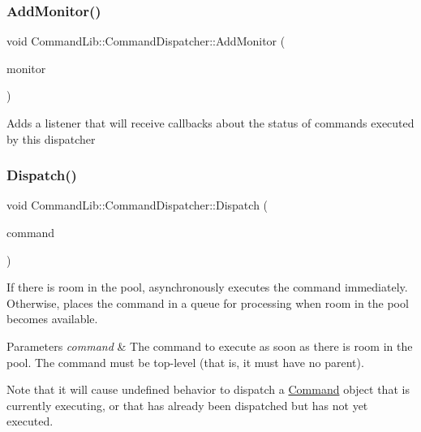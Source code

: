 \subsubsection{\texorpdfstring{Add\+Monitor()}{AddMonitor()}}
{\footnotesize\ttfamily void Command\+Lib\+::\+Command\+Dispatcher\+::\+Add\+Monitor (\begin{DoxyParamCaption}\item[{\mbox{\hyperlink{class_command_lib_1_1_command_monitor}{Command\+Monitor}} $\ast$}]{monitor }\end{DoxyParamCaption})}



Adds a listener that will receive callbacks about the status of commands executed by this dispatcher

\mbox{\label{class_command_lib_1_1_command_dispatcher_a2a1db45e830c48a4085bb2b86e47c692}} 
\subsubsection{\texorpdfstring{Dispatch()}{Dispatch()}}
{\footnotesize\ttfamily void Command\+Lib\+::\+Command\+Dispatcher\+::\+Dispatch (\begin{DoxyParamCaption}\item[{\mbox{\hyperlink{class_command_lib_1_1_command_a3b3e4f00144373299df5c6bb1acc319d}{Command\+::\+Ptr}}}]{command }\end{DoxyParamCaption})}



If there is room in the pool, asynchronously executes the command immediately. Otherwise, places the command in a queue for processing when room in the pool becomes available. 


\begin{DoxyParams}{Parameters}
{\em command} & The command to execute as soon as there is room in the pool. The command must be top-\/level (that is, it must have no parent). \\
\hline
\end{DoxyParams}
Note that it will cause undefined behavior to dispatch a \mbox{\hyperlink{class_command_lib_1_1_command}{Command}} object that is currently executing, or that has already been dispatched but has not yet executed. 

